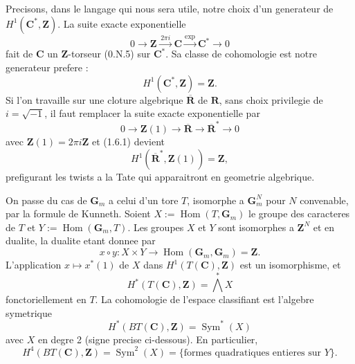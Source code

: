 \documentclass[11pt,a4paper]{article}
\theoremstyle{plain}
\theoremstyle{definition}
\DeclareMathOperator{\Sym}{Sym}
\DeclareMathOperator{\Hom}{Hom}
\begin{document}
Precisons, dans le langage qui nous sera utile, notre choix d'un generateur de $H^1(\mathbf{C}^*, \mathbf{Z})$. La suite exacte exponentielle
\[
0 \to \mathbf{Z} \xrightarrow{\,2\pi i\,} \mathbf{C} \xrightarrow{\exp} \mathbf{C}^* \to 0
\]
fait de $\mathbf{C}$ un $\mathbf{Z}$-torseur (0.N.5) sur $\mathbf{C}^*$. Sa classe de cohomologie est notre generateur prefere :
\begin{equation}\label{1.6.1}
H^1(\mathbf{C}^*, \mathbf{Z}) = \mathbf{Z}.
\end{equation}
Si l'on travaille sur une cloture algebrique $\overline{\mathbf{R}}$ de $\mathbf{R}$, sans choix privilegie de $i = \sqrt{-1}$, il faut remplacer la suite exacte exponentielle par
\[
0 \to \mathbf{Z}(1) \to \overline{\mathbf{R}} \to \overline{\mathbf{R}}^* \to 0
\]
avec $\mathbf{Z}(1) = 2\pi i \mathbf{Z}$ et (1.6.1) devient
\begin{equation}\label{1.6.2}
H^1(\overline{\mathbf{R}}^*, \mathbf{Z}(1)) = \mathbf{Z},
\end{equation}
prefigurant les twists a la Tate qui apparaitront en geometrie algebrique.

On passe du cas de $\mathbf{G}_m$ a celui d'un tore $T$, isomorphe a $\mathbf{G}_m^N$ pour $N$ convenable, par la formule de Kunneth. Soient $X := \Hom(T, \mathbf{G}_m)$ le groupe des caracteres de $T$ et $Y := \Hom(\mathbf{G}_m, T)$. Les groupes $X$ et $Y$ sont isomorphes a $\mathbf{Z}^N$ et en dualite, la dualite etant donnee par
\begin{equation}\label{1.6.3}
x \circ y : X \times Y \to \Hom(\mathbf{G}_m, \mathbf{G}_m) = \mathbf{Z}.
\end{equation}
L'application $x \mapsto x^*(1)$ de $X$ dans $H^1(T(\mathbf{C}), \mathbf{Z})$ est un isomorphisme, et
\begin{equation}\label{1.6.4}
H^*(T(\mathbf{C}), \mathbf{Z}) = \bigwedge^* X
\end{equation}
fonctoriellement en $T$. La cohomologie de l'espace classifiant est l'algebre symetrique
\begin{equation}\label{1.6.5}
H^*(BT(\mathbf{C}), \mathbf{Z}) = \Sym^*(X)
\end{equation}
avec $X$ en degre 2 (signe precise ci-dessous). En particulier,
\begin{equation}\label{1.6.6}
H^4(BT(\mathbf{C}), \mathbf{Z}) = \Sym^2(X) = \{\text{formes quadratiques entieres sur } Y\}.
\end{equation}
\end{document}
